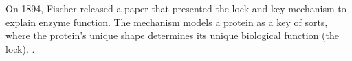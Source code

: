 On 1894, Fischer released a paper that presented the lock-and-key mechanism to explain enzyme function.
The mechanism models a protein as a key of sorts, where the protein's unique shape determines its unique biological function (the lock). \cite{fischer_einfluss_1894}.
